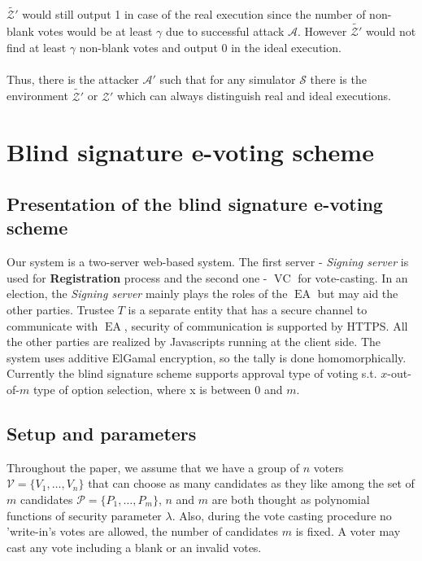 \documentclass[12pt]{article}
\DeclareMathOperator{\ea}{EA}
\DeclareMathOperator{\voc}{VC}
\begin{document}
$\tilde{\mathcal{Z'}}$ would still output 1 in case of the real execution since the number of non-blank votes would be at least $\gamma$ due to successful attack  $\mathcal{A}$. However  $\tilde{\mathcal{Z'}}$ would not find at least $\gamma$ non-blank votes and output 0 in the ideal execution. \\\\
Thus, there is the attacker $\mathcal{A'}$ such that for any simulator $\mathcal{S}$ there is the environment $\tilde{\mathcal{Z'}}$ or $\mathcal{Z'}$ which can always distinguish real and ideal executions. 
%
%
\section {Blind signature e-voting scheme}
\subsection{Presentation of the blind signature e-voting scheme}
Our system is a two-server web-based system. The first server - \textit{Signing server}  is used for \textbf{Registration} process and the second one  - \textit{$\voc$} for vote-casting.  In an election, the \textit{Signing server} mainly plays the roles of the $\ea$ but may aid the other parties.  Trustee $T$ is a separate entity that has a secure channel to communicate with $\ea$, security of communication is supported by HTTPS. All the other parties are realized by Javascripts running at the client side. The system uses additive ElGamal encryption, so the tally is done homomorphically. Currently the blind signature  scheme supports approval type of voting s.t. $x$-out-of-$m$ type of option selection, where x is between 0 and $m$.
\subsection{Setup and parameters}
Throughout the paper, we assume that we have a group of $n$ voters $\mathcal{V} = \{V_1,\dots,V_n\}$ that can choose as many candidates as they like among the set of $m$ candidates $\mathcal{P} = \{P_1,\dots,P_m\}$, $n$ and $m$ are both thought as polynomial functions of security parameter $\lambda$. Also, during the vote casting procedure no 'write-in's votes are allowed, the number of candidates $m$ is fixed. A voter may cast any vote including a blank or an invalid votes. \\
\end{document}
